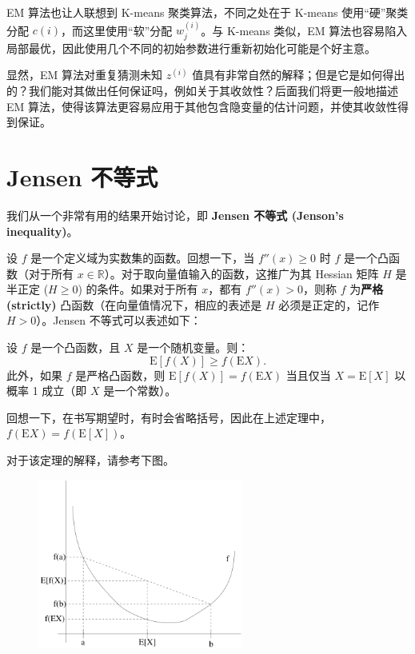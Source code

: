 EM 算法也让人联想到 K-means 聚类算法，不同之处在于 K-means 使用“硬”聚类分配 $c(i)$，而这里使用“软”分配 $w_j^{(i)}$。与 K-means 类似，EM 算法也容易陷入局部最优，因此使用几个不同的初始参数进行重新初始化可能是个好主意。

显然，EM 算法对重复猜测未知 $z^{(i)}$ 值具有非常自然的解释；但是它是如何得出的？我们能对其做出任何保证吗，例如关于其收敛性？后面我们将更一般地描述 EM 算法，使得该算法更容易应用于其他包含隐变量的估计问题，并使其收敛性得到保证。

\section{Jensen 不等式}

我们从一个非常有用的结果开始讨论，即 \textbf{Jensen 不等式 (Jenson's inequality)}。

设 $f$ 是一个定义域为实数集的函数。回想一下，当 $f''(x) \geq 0$ 时 $f$ 是一个凸函数（对于所有 $x \in \mathbb{R}$）。对于取向量值输入的函数，这推广为其 Hessian 矩阵 $H$ 是半正定 ($H \geq 0$) 的条件。如果对于所有 $x$，都有 $f''(x) > 0$，则称 $f$ 为\textbf{严格 (strictly)} 凸函数（在向量值情况下，相应的表述是 $H$ 必须是正定的，记作 $H > 0$）。Jensen 不等式可以表述如下：

\begin{theorem*}
    设 $f$ 是一个凸函数，且 $X$ 是一个随机变量。则：
    \[
        \mathrm{E}[f(X)] \geq f(\mathrm{E}X).
    \]
    此外，如果 $f$ 是严格凸函数，则 $\mathrm{E}[f(X)] = f(\mathrm{E}X)$ 当且仅当 $X = \mathrm{E}[X]$ 以概率 1 成立（即 $X$ 是一个常数）。
\end{theorem*}

回想一下，在书写期望时，有时会省略括号，因此在上述定理中，$f(\mathrm{E}X) = f(\mathrm{E}[X])$。

对于该定理的解释，请参考下图。

\begin{figure}[H]
    \centering
    \includegraphics[width=0.6\textwidth]{figs/Jenson_inequality.png}
\end{figure}


